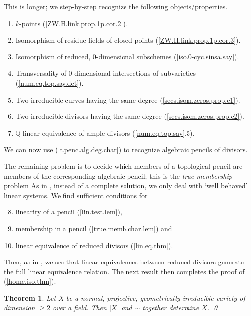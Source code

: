 \documentclass{amsart}
\newtheorem{thm}{Theorem}%
\theoremstyle{definition}
\theoremstyle{remark}
\newcommand{\q}[0]{{\mathbb Q}}
\begin{document}
This is  longer; 
  we step-by-step recognize the following objects/properties.
\begin{enumerate}%
\item  $k$-points  (\ref{ZW.H.link.prop.1p.cor.2}). 
\item Isomorphism of residue fields of closed points (\ref{ZW.H.link.prop.1p.cor.3}). 
\item Isomorphism of reduced, 0-dimensional subschemes (\ref{iso.0-cyc.sinsa.say}). %
\item Transversality of  0-dimensional intersections of subvarieties (\ref{num.eq.top.say.det}). 
\item Two irreducible curves having the same degree (\ref{secs.isom.zeros.prop.c1}).
\item Two irreducible divisors having the same degree (\ref{secs.isom.zeros.prop.c2}).
\item $\q$-linear equivalence of ample divisors  (\ref{num.eq.top.say}.5). 
\end{enumerate} 
We can now use  (\ref{t.penc.alg.deg.char})  to recognize  algebraic pencils of divisors. 

The remaining problem is to decide which members of a topological pencil
are members of the corresponding algebraic pencil; this is the {\it true membership} problem  \cite[5.3.5]{k-lo-2}
As in \cite[Chap.5]{k-lo-2}, instead of  a complete solution, we only deal with  `well behaved' linear systems.  
We find sufficient  conditions for
\begin{enumerate}\setcounter{enumi}{7}
\item linearity of a pencil  (\ref{lin.test.lem}),
\item membership in a pencil  (\ref{true.memb.char.lem}) and
\item linear equivalence of reduced divisors (\ref{lin.eq.thm}). 
\end{enumerate} 
Then, as in \cite[5.3.8]{k-lo-2}, we see that  linear equivalences between reduced divisors generate the full linear equivalence relation. 
The next result then completes the proof of  
(\ref{home.iso.thm}). 

\begin{thm}\cite[Main Thm.]{k-lo} \label{main.thm.pf.step.0}
 Let $X$ be a normal, projective, geometrically irreducible variety of dimension $\geq 2$ over a field. Then  $|X|$ and $\sim$  together determine $X$. \qed
\end{thm}
\end{document}
